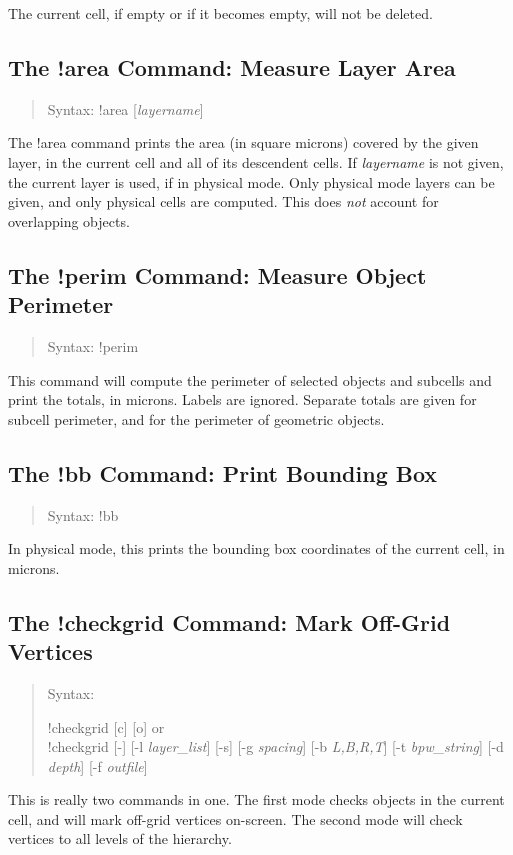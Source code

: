 The current cell, if empty or if it becomes empty, will not be deleted.


\subsection{The {\cb !area} Command: Measure Layer Area}
\begin{quote}
Syntax: {\vt !area} [{\it layername\/}]
\end{quote}
The {\cb !area} command prints the area (in square microns) covered by
the given layer, in the current cell and all of its descendent cells. 
If {\it layername} is not given, the current layer is used, if in
physical mode.  Only physical mode layers can be given, and only
physical cells are computed.  This does {\it not} account for
overlapping objects.

\subsection{The {\cb !perim} Command: Measure Object Perimeter}
\begin{quote}
Syntax: {\vt !perim}
\end{quote}
This command will compute the perimeter of selected objects and
subcells and print the totals, in microns.  Labels are ignored. 
Separate totals are given for subcell perimeter, and for the perimeter
of geometric objects.

\subsection{The {\cb !bb} Command: Print Bounding Box}
\begin{quote}
Syntax: {\vt !bb}
\end{quote}
In physical mode, this prints the bounding box coordinates of the
current cell, in microns.

\subsection{The {\cb !checkgrid} Command: Mark Off-Grid Vertices}
\begin{quote}
Syntax: \parbox[t]{5in}{{\vt !checkgrid} [{\vt c}] [{\vt o}] or\\
 {\vt !checkgrid} [{\vt -}] [{\vt -l} {\it layer\_list\/}] [{\vt -s}]
 [{\vt -g} {\it spacing\/}] [{\vt -b} {\it L,B,R,T\/}]
 [{\vt -t} {\it bpw\_string\/}] [{\vt -d} {\it depth\/}]
 [{\vt -f} {\it outfile\/}]}
\end{quote}
This is really two commands in one.  The first mode checks objects in
the current cell, and will mark off-grid vertices on-screen.  The
second mode will check vertices to all levels of the hierarchy.

